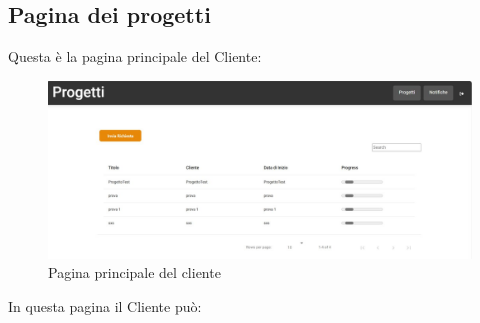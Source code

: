 \documentclass{article}
\begin{document}
\subsection{Pagina dei progetti}
Questa è la pagina principale del Cliente:
 \begin{figure}[H]
      \centering
      \includegraphics[width=\textwidth]{documenti/Screenshot manuale utente/home cliente.jpeg}
      \caption{Pagina principale del cliente}
      \label{pagcli}
    \end{figure} 
In questa pagina il Cliente può:
\end{document}
